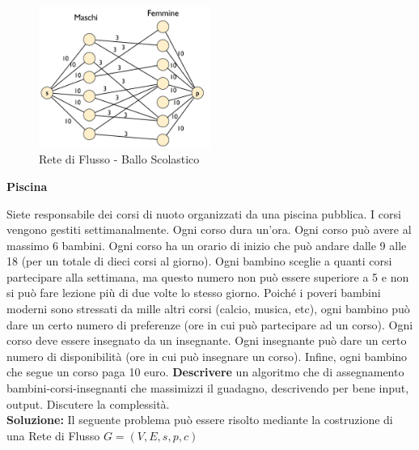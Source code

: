 \documentclass[../cheatSheetAlgoritmi.tex]{subfiles}
\begin{document}
\begin{figure}[h]
\caption{Rete di Flusso - Ballo Scolastico}
\centering
\includegraphics[width=0.5\textwidth]{../img/Locale_4.jpg}
\end{figure}
\newpage
\begin{flushleft}
\textbf{Piscina}
\end{flushleft}
Siete responsabile dei corsi di nuoto organizzati da una piscina pubblica. I corsi vengono gestiti settimanalmente. Ogni corso dura un'ora. Ogni corso può avere al massimo 6 bambini. Ogni corso ha un orario di inizio che può andare dalle 9 alle 18 (per un totale di dieci corsi al giorno). Ogni bambino sceglie a quanti corsi partecipare alla settimana, ma questo numero non può essere superiore a 5 e non si può fare lezione più di due volte lo stesso giorno. Poiché i poveri bambini moderni sono stressati da mille altri corsi (calcio, musica, etc), ogni bambino può dare un certo numero di preferenze (ore in cui può partecipare ad un corso). Ogni corso deve essere insegnato da un insegnante. Ogni insegnante può dare un certo numero di disponibilità (ore in cui può insegnare un corso). Infine, ogni bambino che segue un corso paga 10 euro. \textbf{Descrivere} un algoritmo che di assegnamento bambini-corsi-insegnanti che massimizzi il guadagno, descrivendo per bene input, output. Discutere la complessità.\\
\textbf{Soluzione:} Il seguente problema può essere risolto mediante la costruzione di una Rete di Flusso $G = (V, E, s, p, c)$
\end{document}
